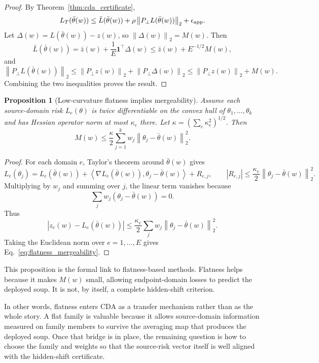 \documentclass{article}
\newtheorem{proposition}[theorem]{Proposition}
\theoremstyle{definition}
\newcommand{\one}{\mathbf{1}}
\newcommand{\norm}[1]{\left\lVert #1 \right\rVert}
\newcommand{\abs}[1]{\left\lvert #1 \right\rvert}
\newcommand{\inner}[2]{\left\langle #1, #2 \right\rangle}
\newcommand{\thetaw}{\bar{\theta}(w)}
\begin{document}
\begin{proof}
By Theorem~\ref{thm:cda_certificate},
\[
L_T(\thetaw)
\le
\bar L(\thetaw)+\rho\norm{P_\perp L(\thetaw)}_2+\epsilon_{\rm app}.
\]
Let \(\Delta(w)=L(\thetaw)-z(w)\), so \(\norm{\Delta(w)}_2=M(w)\). Then
\[
\bar L(\thetaw)
=
\bar z(w)+\frac{1}{E}\one^\top\Delta(w)
\le
\bar z(w)+E^{-1/2}M(w),
\]
and
\[
\norm{P_\perp L(\thetaw)}_2
\le
\norm{P_\perp z(w)}_2+\norm{P_\perp\Delta(w)}_2
\le
\norm{P_\perp z(w)}_2+M(w).
\]
Combining the two inequalities proves the result.
\end{proof}

\begin{proposition}[Low-curvature flatness implies mergeability]
\label{prop:flatness}
Assume each source-domain risk \(L_e(\theta)\) is twice differentiable on the convex hull of \(\theta_1,\dots,\theta_k\) and has Hessian operator norm at most \(\kappa_e\) there. Let \(\kappa=(\sum_e\kappa_e^2)^{1/2}\). Then
\begin{equation}
M(w)
\le
\frac{\kappa}{2}\sum_{j=1}^k w_j\norm{\theta_j-\thetaw}_2^2.
\label{eq:flatness_mergeability}
\end{equation}
\end{proposition}

\begin{proof}
For each domain \(e\), Taylor's theorem around \(\thetaw\) gives
\[
L_e(\theta_j)
=
L_e(\thetaw)
+\inner{\nabla L_e(\thetaw)}{\theta_j-\thetaw}
+R_{e,j},
\qquad
\abs{R_{e,j}}\le \frac{\kappa_e}{2}\norm{\theta_j-\thetaw}_2^2.
\]
Multiplying by \(w_j\) and summing over \(j\), the linear term vanishes because
\[
\sum_j w_j(\theta_j-\thetaw)=0.
\]
Thus
\[
\abs{z_e(w)-L_e(\thetaw)}
\le
\frac{\kappa_e}{2}\sum_jw_j\norm{\theta_j-\thetaw}_2^2.
\]
Taking the Euclidean norm over \(e=1,\dots,E\) gives Eq.~\eqref{eq:flatness_mergeability}.
\end{proof}

This proposition is the formal link to flatness-based methods. Flatness helps because it makes \(M(w)\) small, allowing endpoint-domain losses to predict the deployed soup. It is not, by itself, a complete hidden-shift criterion.

In other words, flatness enters CDA as a transfer mechanism rather than as the whole story. A flat family is valuable because it allows source-domain information measured on family members to survive the averaging map that produces the deployed soup. Once that bridge is in place, the remaining question is how to choose the family and weights so that the source-risk vector itself is well aligned with the hidden-shift certificate.
\end{document}
